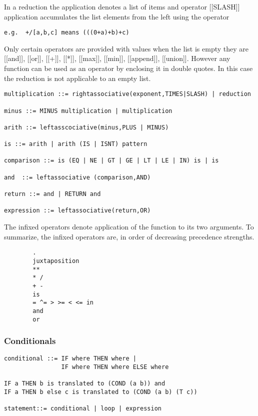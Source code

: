 \documentclass{article}
\begin{document}
In a reduction the application denotes a list of items and
operator [[SLASH]] application accumulates the list elements from the
left using the operator
\begin{verbatim} 
e.g.  +/[a,b,c] means (((0+a)+b)+c)
\end{verbatim} 

Only certain operators are provided with values when the list is empty
they are [[and]], [[or]], [[+]], [[*]], [[max]], [[min]], [[append]], 
[[union]]. However any function can be used as an operator by enclosing it 
in double quotes. In this case the reduction is not applicable to an
empty list.
\begin{verbatim}  
multiplication ::= rightassociative(exponent,TIMES|SLASH) | reduction
 
minus ::= MINUS multiplication | multiplication
 
arith ::= leftasscociative(minus,PLUS | MINUS)
 
is ::= arith | arith (IS | ISNT) pattern
 
comparison ::= is (EQ | NE | GT | GE | LT | LE | IN) is | is
 
and  ::= leftassociative (comparison,AND)
 
return ::= and | RETURN and
 
expression ::= leftassociative(return,OR)
\end{verbatim}  

The infixed operators denote application of the function to its
two arguments. To summarize,
the infixed operators are, in order of decreasing precedence
strengths.
\begin{verbatim}  
        .
        juxtaposition
        **
        * /
        + -
        is
        = ^= > >= < <= in
        and
        or
\end{verbatim} 

\subsubsection{Conditionals}
\label{sec:boot:conditional}

\begin{verbatim}  
conditional ::= IF where THEN where |
                IF where THEN where ELSE where
 
IF a THEN b is translated to (COND (a b)) and
IF a THEN b else c is translated to (COND (a b) (T c))
 
statement::= conditional | loop | expression
\end{verbatim} 
\end{document}
